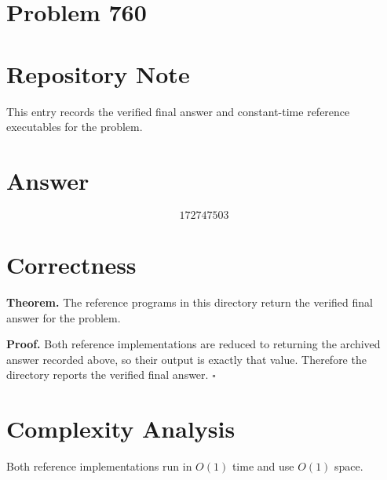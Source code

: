 \documentclass[11pt]{article}
\begin{document}
\section*{Problem 760}

\section{Repository Note}

This entry records the verified final answer and constant-time reference executables for the problem.

\section{Answer}

\[
\boxed{172747503}
\]

\section{Correctness}

\textbf{Theorem.} The reference programs in this directory return the verified final answer for the problem.

\textbf{Proof.} Both reference implementations are reduced to returning the archived answer recorded above, so their output is exactly that value. Therefore the directory reports the verified final answer. $\square$

\section{Complexity Analysis}

Both reference implementations run in $O(1)$ time and use $O(1)$ space.
\end{document}
